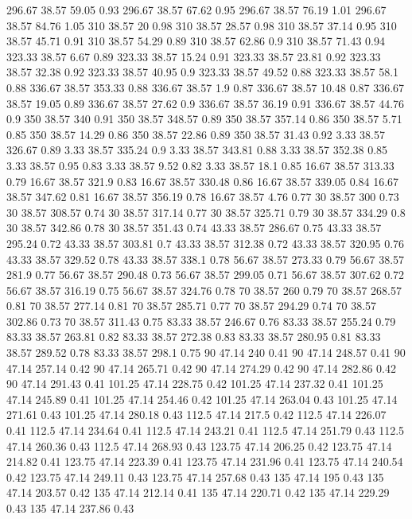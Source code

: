 296.67	38.57	59.05	0.93
296.67	38.57	67.62	0.95
296.67	38.57	76.19	1.01
296.67	38.57	84.76	1.05
310	38.57	20	0.98
310	38.57	28.57	0.98
310	38.57	37.14	0.95
310	38.57	45.71	0.91
310	38.57	54.29	0.89
310	38.57	62.86	0.9
310	38.57	71.43	0.94
323.33	38.57	6.67	0.89
323.33	38.57	15.24	0.91
323.33	38.57	23.81	0.92
323.33	38.57	32.38	0.92
323.33	38.57	40.95	0.9
323.33	38.57	49.52	0.88
323.33	38.57	58.1	0.88
336.67	38.57	353.33	0.88
336.67	38.57	1.9	0.87
336.67	38.57	10.48	0.87
336.67	38.57	19.05	0.89
336.67	38.57	27.62	0.9
336.67	38.57	36.19	0.91
336.67	38.57	44.76	0.9
350	38.57	340	0.91
350	38.57	348.57	0.89
350	38.57	357.14	0.86
350	38.57	5.71	0.85
350	38.57	14.29	0.86
350	38.57	22.86	0.89
350	38.57	31.43	0.92
3.33	38.57	326.67	0.89
3.33	38.57	335.24	0.9
3.33	38.57	343.81	0.88
3.33	38.57	352.38	0.85
3.33	38.57	0.95	0.83
3.33	38.57	9.52	0.82
3.33	38.57	18.1	0.85
16.67	38.57	313.33	0.79
16.67	38.57	321.9	0.83
16.67	38.57	330.48	0.86
16.67	38.57	339.05	0.84
16.67	38.57	347.62	0.81
16.67	38.57	356.19	0.78
16.67	38.57	4.76	0.77
30	38.57	300	0.73
30	38.57	308.57	0.74
30	38.57	317.14	0.77
30	38.57	325.71	0.79
30	38.57	334.29	0.8
30	38.57	342.86	0.78
30	38.57	351.43	0.74
43.33	38.57	286.67	0.75
43.33	38.57	295.24	0.72
43.33	38.57	303.81	0.7
43.33	38.57	312.38	0.72
43.33	38.57	320.95	0.76
43.33	38.57	329.52	0.78
43.33	38.57	338.1	0.78
56.67	38.57	273.33	0.79
56.67	38.57	281.9	0.77
56.67	38.57	290.48	0.73
56.67	38.57	299.05	0.71
56.67	38.57	307.62	0.72
56.67	38.57	316.19	0.75
56.67	38.57	324.76	0.78
70	38.57	260	0.79
70	38.57	268.57	0.81
70	38.57	277.14	0.81
70	38.57	285.71	0.77
70	38.57	294.29	0.74
70	38.57	302.86	0.73
70	38.57	311.43	0.75
83.33	38.57	246.67	0.76
83.33	38.57	255.24	0.79
83.33	38.57	263.81	0.82
83.33	38.57	272.38	0.83
83.33	38.57	280.95	0.81
83.33	38.57	289.52	0.78
83.33	38.57	298.1	0.75
90	47.14	240	0.41
90	47.14	248.57	0.41
90	47.14	257.14	0.42
90	47.14	265.71	0.42
90	47.14	274.29	0.42
90	47.14	282.86	0.42
90	47.14	291.43	0.41
101.25	47.14	228.75	0.42
101.25	47.14	237.32	0.41
101.25	47.14	245.89	0.41
101.25	47.14	254.46	0.42
101.25	47.14	263.04	0.43
101.25	47.14	271.61	0.43
101.25	47.14	280.18	0.43
112.5	47.14	217.5	0.42
112.5	47.14	226.07	0.41
112.5	47.14	234.64	0.41
112.5	47.14	243.21	0.41
112.5	47.14	251.79	0.43
112.5	47.14	260.36	0.43
112.5	47.14	268.93	0.43
123.75	47.14	206.25	0.42
123.75	47.14	214.82	0.41
123.75	47.14	223.39	0.41
123.75	47.14	231.96	0.41
123.75	47.14	240.54	0.42
123.75	47.14	249.11	0.43
123.75	47.14	257.68	0.43
135	47.14	195	0.43
135	47.14	203.57	0.42
135	47.14	212.14	0.41
135	47.14	220.71	0.42
135	47.14	229.29	0.43
135	47.14	237.86	0.43
